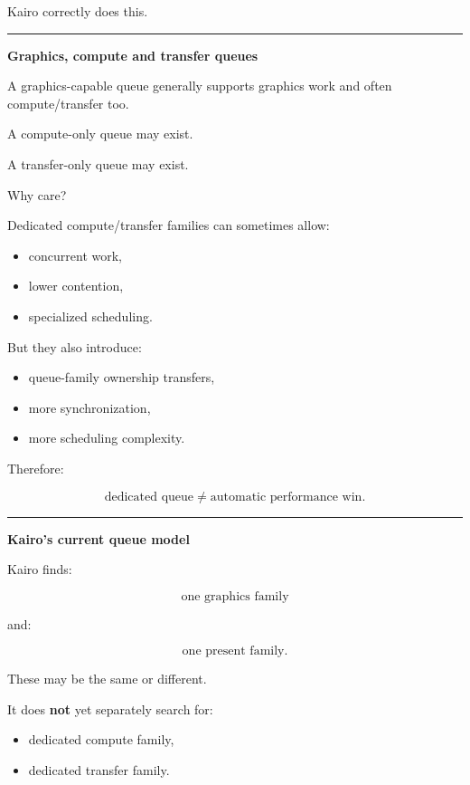 Kairo correctly does this.

\begin{center}\rule{0.5\linewidth}{0.5pt}\end{center}

\textbf{Graphics, compute and transfer queues}

A graphics-capable queue generally supports graphics work and often compute/transfer too.

A compute-only queue may exist.

A transfer-only queue may exist.

Why care?

Dedicated compute/transfer families can sometimes allow:

\begin{itemize}
\tightlist
\item
  concurrent work,
\item
  lower contention,
\item
  specialized scheduling.
\end{itemize}

But they also introduce:

\begin{itemize}
\tightlist
\item
  queue-family ownership transfers,
\item
  more synchronization,
\item
  more scheduling complexity.
\end{itemize}

Therefore:

\[
\boxed{
\text{dedicated queue}
\neq
\text{automatic performance win}.
}
\]

\begin{center}\rule{0.5\linewidth}{0.5pt}\end{center}

\textbf{Kairo's current queue model}

Kairo finds:

\[
\boxed{
\text{one graphics family}
}
\]

and:

\[
\boxed{
\text{one present family}.
}
\]

These may be the same or different.

It does \textbf{not} yet separately search for:

\begin{itemize}
\tightlist
\item
  dedicated compute family,
\item
  dedicated transfer family.
\end{itemize}

